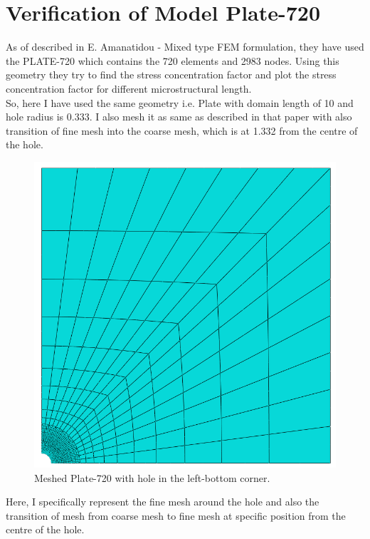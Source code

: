 \documentclass[12pt]{article}
\begin{document}
\newpage
\section{Verification of Model Plate-720}
As of described in E. Amanatidou - Mixed type FEM formulation, they have used the PLATE-720 which contains the 720 elements and 2983 nodes. Using this geometry they try to find the stress concentration factor and plot the stress concentration factor for different microstructural length.
\\
So, here I have used the same geometry i.e. Plate with domain length of 10 and hole radius is 0.333. I also mesh it as same as described in that paper with also transition of fine mesh into the coarse mesh, which is at 1.332 from the centre of the hole.   
\begin{figure}[H]
	\begin{center}
		\includegraphics[scale=0.35]{mesh_part.png} 
	\end{center}  
   \caption{Meshed Plate-720 with hole in the left-bottom corner.}
\end{figure}
Here, I specifically represent the fine mesh around the hole and also the transition of mesh from coarse mesh to fine mesh at specific position from the centre of the hole.
\end{document}
